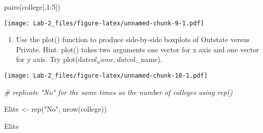 \documentclass[
]{article}
\newenvironment{Shaded}{\begin{snugshade}}{\end{snugshade}}
\newcommand{\AttributeTok}[1]{\textcolor[rgb]{0.77,0.63,0.00}{#1}}
\newcommand{\CommentTok}[1]{\textcolor[rgb]{0.56,0.35,0.01}{\textit{#1}}}
\newcommand{\DecValTok}[1]{\textcolor[rgb]{0.00,0.00,0.81}{#1}}
\newcommand{\FunctionTok}[1]{\textcolor[rgb]{0.00,0.00,0.00}{#1}}
\newcommand{\NormalTok}[1]{#1}
\newcommand{\OtherTok}[1]{\textcolor[rgb]{0.56,0.35,0.01}{#1}}
\newcommand{\SpecialCharTok}[1]{\textcolor[rgb]{0.00,0.00,0.00}{#1}}
\newcommand{\StringTok}[1]{\textcolor[rgb]{0.31,0.60,0.02}{#1}}
\providecommand{\tightlist}{%
  \setlength{\itemsep}{0pt}\setlength{\parskip}{0pt}}
\begin{document}
\begin{Shaded}
\begin{Highlighting}[]
\FunctionTok{pairs}\NormalTok{(college[,}\DecValTok{1}\SpecialCharTok{:}\DecValTok{5}\NormalTok{])}
\end{Highlighting}
\end{Shaded}

\texttt{[image: Lab-2\_files/figure-latex/unnamed-chunk-9-1.pdf]}

\begin{enumerate}
\def\labelenumi{\roman{enumi}.}
\setcounter{enumi}{2}
\tightlist
\item
  Use the plot() function to produce side-by-side boxplots of Outstate
  versus Private. Hint: plot() takes two arguments one vector for x axis
  and one vector for y axis. Try plot(dat\(col_name, dat\)col\_name).
\end{enumerate}

\begin{Shaded}
\end{Shaded}

\texttt{[image: Lab-2\_files/figure-latex/unnamed-chunk-10-1.pdf]}

\begin{Shaded}
\begin{Highlighting}[]
\CommentTok{\# replicate "No" for the same times as the number of colleges using rep()}

\NormalTok{Elite }\OtherTok{\textless{}{-}} \FunctionTok{rep}\NormalTok{(}\StringTok{"No"}\NormalTok{, }\FunctionTok{nrow}\NormalTok{(college))}

\NormalTok{Elite}
\end{Highlighting}
\end{Shaded}
\end{document}
